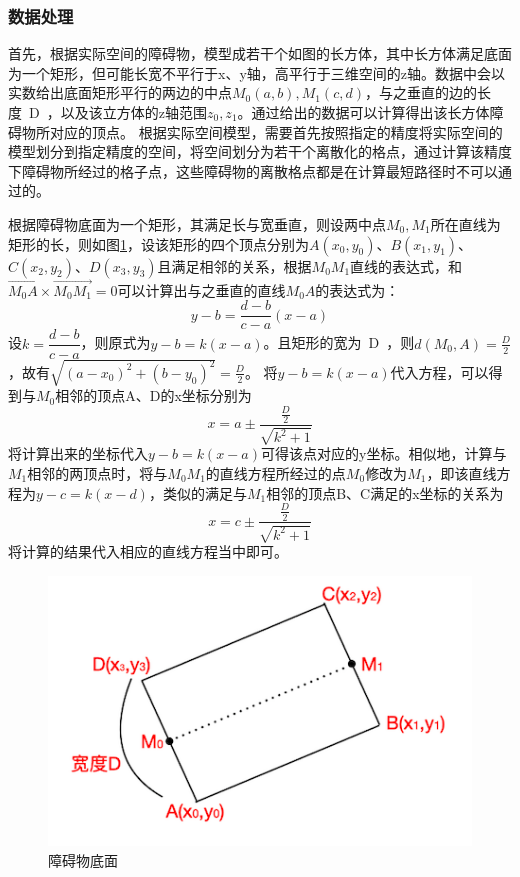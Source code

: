 \subsubsection{数据处理}
\par 首先，根据实际空间的障碍物，模型成若干个如图的长方体，其中长方体满足底面为一个矩形，但可能长宽不平行于x、y轴，高平行于三维空间的z轴。数据中会以实数给出底面矩形平行的两边的中点$M_0(a,b),M_1(c,d)$，与之垂直的边的长度~D~，以及该立方体的z轴范围$z_0,z_1$。通过给出的数据可以计算得出该长方体障碍物所对应的顶点。
根据实际空间模型，需要首先按照指定的精度将实际空间的模型划分到指定精度的空间，将空间划分为若干个离散化的格点，通过计算该精度下障碍物所经过的格子点，这些障碍物的离散格点都是在计算最短路径时不可以通过的。
\par 根据障碍物底面为一个矩形，其满足长与宽垂直，则设两中点$M_0,M_1$所在直线为矩形的长，则如图\ref{fig:obstacle_bottom}，设该矩形的四个顶点分别为$A(x_0,y_0)$、$B(x_1,y_1)$、$C(x_2,y_2)$、$D(x_3,y_3)$且满足相邻的关系，根据$M_0M_1$直线的表达式，和$\vec{M_0A}\times\vec{M_0M_1}=0$可以计算出与之垂直的直线$M_0A$的表达式为：
$$
    y-b=\dfrac{d-b}{c-a}(x-a)
$$
设$k=\dfrac{d-b}{c-a}$，则原式为$y-b=k(x-a)$。且矩形的宽为~D~，则$d(M_0,A)=\frac{D}{2}$，故有$\sqrt{(a-x_0)^2+(b-y_0)^2}=\frac{D}{2}$。
将$y-b=k(x-a)$代入方程，可以得到与$M_0$相邻的顶点A、D的x坐标分别为
$$
    x=a\pm\dfrac{\frac{D}{2}}{\sqrt{k^2+1}}
$$
将计算出来的坐标代入$y-b=k(x-a)$可得该点对应的y坐标。相似地，计算与$M_1$相邻的两顶点时，将与$M_0M_1$的直线方程所经过的点$M_0$修改为$M_1$，即该直线方程为$y-c=k(x-d)$，类似的满足与$M_1$相邻的顶点B、C满足的x坐标的关系为
$$
    x=c\pm\dfrac{\frac{D}{2}}{\sqrt{k^2+1}}
$$
将计算的结果代入相应的直线方程当中即可。
\begin{figure}[!htb]
    \centering
    \includegraphics[width=12cm]{figures/obstacle_bottom.png}
    \caption{障碍物底面}
    \label{fig:obstacle_bottom}
\end{figure}
